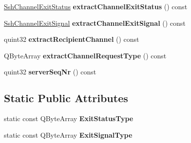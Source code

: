 \begin{DoxyCompactItemize}
\item 
\mbox{\label{class_q_ssh_1_1_internal_1_1_ssh_incoming_packet_a12c1bf015a6200b93fa3b46b2a0c10fa}} 
\mbox{\hyperlink{struct_q_ssh_1_1_internal_1_1_ssh_channel_exit_status}{Ssh\+Channel\+Exit\+Status}} {\bfseries extract\+Channel\+Exit\+Status} () const
\item 
\mbox{\label{class_q_ssh_1_1_internal_1_1_ssh_incoming_packet_ab124b11aaa26314fda4e3318c79243b8}} 
\mbox{\hyperlink{struct_q_ssh_1_1_internal_1_1_ssh_channel_exit_signal}{Ssh\+Channel\+Exit\+Signal}} {\bfseries extract\+Channel\+Exit\+Signal} () const
\item 
\mbox{\label{class_q_ssh_1_1_internal_1_1_ssh_incoming_packet_a8933a28451c61be228c7eac13f7d2ba0}} 
quint32 {\bfseries extract\+Recipient\+Channel} () const
\item 
\mbox{\label{class_q_ssh_1_1_internal_1_1_ssh_incoming_packet_a3a31989c1929a2a8dabdfd8117539644}} 
Q\+Byte\+Array {\bfseries extract\+Channel\+Request\+Type} () const
\item 
\mbox{\label{class_q_ssh_1_1_internal_1_1_ssh_incoming_packet_ad61edaa3f3c76dddf9699e06f1fb42c4}} 
quint32 {\bfseries server\+Seq\+Nr} () const
\end{DoxyCompactItemize}
\subsection*{Static Public Attributes}
\begin{DoxyCompactItemize}
\item 
\mbox{\label{class_q_ssh_1_1_internal_1_1_ssh_incoming_packet_acc93935ab0ce611d7bc9373d1a6d0e6a}} 
static const Q\+Byte\+Array {\bfseries Exit\+Status\+Type}
\item 
\mbox{\label{class_q_ssh_1_1_internal_1_1_ssh_incoming_packet_a08cf1ef611a8b2ed638069953ba1d8ec}} 
static const Q\+Byte\+Array {\bfseries Exit\+Signal\+Type}
\end{DoxyCompactItemize}
